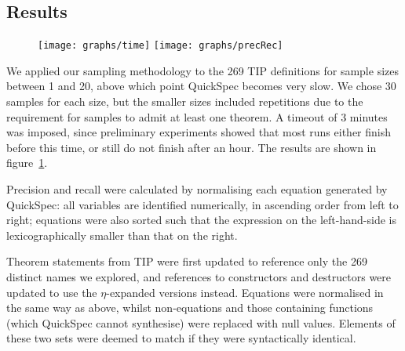 \subsection{Results}

\begin{figure}
  \texttt{[image: graphs/time]}
  \texttt{[image: graphs/precRec]}
  \caption{}
  \label{figure:quickspec_results}
\end{figure}

We applied our sampling methodology to the 269 TIP definitions for sample sizes
between 1 and 20, above which point QuickSpec becomes very slow. We chose 30
samples for each size, but the smaller sizes included repetitions due to the
requirement for samples to admit at least one theorem. A timeout of 3 minutes
was imposed, since preliminary experiments showed that most runs either finish
before this time, or still do not finish after an hour. The results are shown in
figure~\ref{figure:quickspec_results}.

Precision and recall were calculated by normalising each equation generated by
QuickSpec: all variables are identified numerically, in ascending order from
left to right; equations were also sorted such that the expression on the
left-hand-side is lexicographically smaller than that on the right.

Theorem statements from TIP were first updated to reference only the 269
distinct names we explored, and references to constructors and destructors were
updated to use the $\eta$-expanded versions instead. Equations were normalised
in the same way as above, whilst non-equations and those containing
 functions (which QuickSpec cannot synthesise) were replaced with
null values. Elements of these two sets were deemed to match if they were
syntactically identical.




